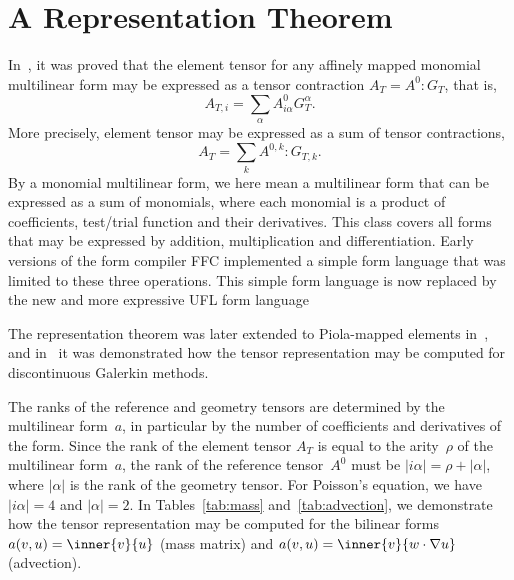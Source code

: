 \section{A Representation Theorem}

In~\cite{KirbyLogg2006}, it was proved that the element tensor for any
affinely mapped monomial multilinear form may be expressed as a tensor
contraction $A_T = A^0 : G_T$, that is,
\begin{equation*}
  A_{T,i} = \sum_{\alpha} A^0_{i\alpha} G_T^{\alpha}.
\end{equation*}
More precisely, element tensor may be expressed as a sum of tensor
contractions,
\begin{equation} \label{eq:tensorcontraction}
  A_T = \sum_k A^{0,k} : G_{T,k}.
\end{equation}
By a monomial multilinear form, we here mean a multilinear form that
can be expressed as a sum of monomials, where each monomial is a
product of coefficients, test/trial function and their derivatives.
This class covers all forms that may be expressed by addition,
multiplication and differentiation. Early versions of the form
compiler FFC implemented a simple form language that was limited to
these three operations. This simple form language is now replaced by
the new and more expressive UFL form language

The representation theorem was later extended to Piola-mapped elements
in~\cite{RognesKirbyLogg2009}, and in~\cite{OlgaardLoggWells2008} it was
demonstrated how the tensor representation may be computed for
discontinuous Galerkin methods.

The ranks of the reference and geometry tensors are determined by the
multilinear form~$a$, in particular by the number of coefficients and
derivatives of the form. Since the rank of the element tensor $A_T$ is
equal to the arity~$\rho$ of the multilinear form~$a$, the rank of the
reference tensor~$A^0$ must be $|i\alpha| = \rho + |\alpha|$, where
$|\alpha|$ is the rank of the geometry tensor. For Poisson's equation,
we have $|i\alpha| = 4$ and $|\alpha| = 2$. In Tables~\ref{tab:mass}
and~\ref{tab:advection}, we demonstrate how the tensor representation
may be computed for the bilinear forms $a(v, u) = \inner{v}{u}$ (mass
matrix) and $a(v, u) = \inner{v}{w \cdot \nabla u}$ (advection).

